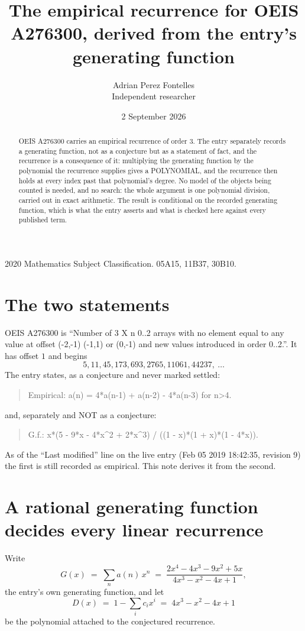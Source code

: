 \documentclass[11pt,a4paper]{article}
\title{The empirical recurrence for OEIS A276300, derived from the entry's generating function}
\author{Adrian Perez Fontelles\\ \small Independent researcher}
\date{2 September 2026}
\theoremstyle{plain}
\theoremstyle{definition}
\begin{document}
\maketitle

\begin{abstract}
OEIS A276300 carries an empirical recurrence of order $3$. The entry separately records a
generating function, not as a conjecture but as a statement of fact, and the recurrence is a
consequence of it: multiplying the generating function by the polynomial the recurrence
supplies gives a POLYNOMIAL, and the recurrence then holds at every index past that
polynomial's degree. No model of the objects being counted is needed, and no search: the
whole argument is one polynomial division, carried out in exact arithmetic. The result is
conditional on the recorded generating function, which is what the entry asserts and what is
checked here against every published term.
\end{abstract}

\noindent\small 2020 Mathematics Subject Classification. 05A15, 11B37, 30B10.\normalsize

\section{The two statements}

OEIS A276300 is ``Number of 3 X n 0..2 arrays with no element equal to any value at offset (-2,-1) (-1,1) or (0,-1) and new values introduced in order 0..2.''. It has offset $1$ and begins
\[
5, 11, 45, 173, 693, 2765, 11061, 44237,\ \dots
\]
The entry states, as a conjecture and never marked settled:
\begin{quote}
Empirical: a(n) = 4*a(n-1) + a(n-2) - 4*a(n-3) for n>4.
\end{quote}
and, separately and NOT as a conjecture:
\begin{quote}
G.f.: x*(5 - 9*x - 4*x\^{}2 + 2*x\^{}3) / ((1 - x)*(1 + x)*(1 - 4*x)).
\end{quote}
As of the ``Last modified'' line on the live entry (Feb 05 2019 18:42:35, revision 9) the first is still
recorded as empirical. This note derives it from the second.

\section{A rational generating function decides every linear recurrence}

Write
\[
G(x)\;=\;\sum_{n}a(n)\,x^{n}\;=\;\frac{2 x^{4} - 4 x^{3} - 9 x^{2} + 5 x}{4 x^{3} - x^{2} - 4 x + 1},
\]
the entry's own generating function, and let
\[
D(x)\;=\;1-\sum_i c_i x^{i}\;=\;4 x^{3} - x^{2} - 4 x + 1
\]
be the polynomial attached to the conjectured recurrence.
\end{document}
